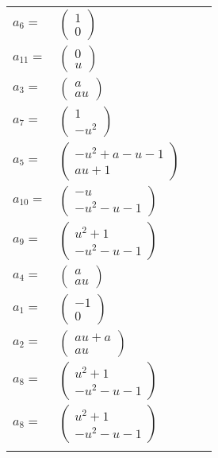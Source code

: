 \documentclass[1p]{elsarticle_modified}
\theoremstyle{definition}
\begin{document}
\begin{tabular}{m{7pt} m{180pt} m{7pt} m{180pt} }
\flushright $a_{6}=$&$\begin{pmatrix}1\\0\end{pmatrix}$ \\
\flushright $a_{11}=$&$\begin{pmatrix}0\\u\end{pmatrix}$ \\
\flushright $a_{3}=$&$\begin{pmatrix}a\\a u\end{pmatrix}$ \\
\flushright $a_{7}=$&$\begin{pmatrix}1\\- u^2\end{pmatrix}$ \\
\flushright $a_{5}=$&$\begin{pmatrix}- u^2+a- u-1\\a u+1\end{pmatrix}$ \\
\flushright $a_{10}=$&$\begin{pmatrix}- u\\- u^2- u-1\end{pmatrix}$ \\
\flushright $a_{9}=$&$\begin{pmatrix}u^2+1\\- u^2- u-1\end{pmatrix}$ \\
\flushright $a_{4}=$&$\begin{pmatrix}a\\a u\end{pmatrix}$ \\
\flushright $a_{1}=$&$\begin{pmatrix}-1\\0\end{pmatrix}$ \\
\flushright $a_{2}=$&$\begin{pmatrix}a u+a\\a u\end{pmatrix}$ \\
\flushright $a_{8}=$&$\begin{pmatrix}u^2+1\\- u^2- u-1\end{pmatrix}$\\ \flushright $a_{8}=$&$\begin{pmatrix}u^2+1\\- u^2- u-1\end{pmatrix}$\\&\end{tabular}
\end{document}
